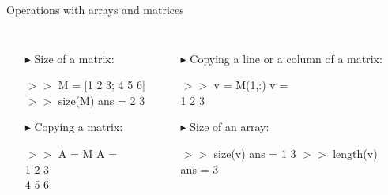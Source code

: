 \documentclass[xcolor={dvipsnames,rgb}, aspectratio=169]{beamer}
\begin{document}
\begin{frame}{Operations with arrays and matrices}
    \begin{columns}
        \begin{itemize}
            \vspace{-10pt}
            \item[$\blacktriangleright$] Size of a matrix:
                  \begin{tcolorbox}[colback=white,colframe=bluepoli]
                      $>>$ M = [1 2 3; 4 5 6] \\
                      $>>$ size(M)
                      \tcblower
                      ans = 2 3
                  \end{tcolorbox}

                  \vspace{-5pt}
            \item[$\blacktriangleright$] Copying a matrix:
                  \begin{tcolorbox}[colback=white,colframe=bluepoli]
                      $>>$ A = M
                      \tcblower
                      A = \\
                      \hspace{3em} 1 \hspace{3em} 2 \hspace{3em} 3 \\
                      \hspace{3em} 4 \hspace{3em} 5 \hspace{3em} 6
                  \end{tcolorbox}
        \end{itemize}
        \begin{itemize}
            \vspace{-10pt}
            \item[$\blacktriangleright$] Copying a line or a column of a matrix:
                  \begin{tcolorbox}[colback=white,colframe=bluepoli]
                      $>>$ v = M(1,:)
                      \tcblower
                      v = \\
                      \hspace{3em} 1 \hspace{3em} 2 \hspace{3em} 3
                  \end{tcolorbox}

            \item[$\blacktriangleright$] Size of an array:
                  \begin{tcolorbox}[colback=white,colframe=bluepoli]
                      $>>$ size(v)
                      ans = 1 3
                      \tcblower
                      $>>$ length(v)\\
                      ans = 3
                  \end{tcolorbox}
        \end{itemize}
    \end{columns}
\end{frame}
\end{document}
